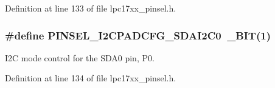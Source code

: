 Definition at line 133 of file lpc17xx\+\_\+pinsel.\+h.

\subsubsection[{\texorpdfstring{P\+I\+N\+S\+E\+L\+\_\+\+I2\+C\+P\+A\+D\+C\+F\+G\+\_\+\+S\+D\+A\+I2\+C0}{PINSEL_I2CPADCFG_SDAI2C0}}]{\setlength{\rightskip}{0pt plus 5cm}\#define P\+I\+N\+S\+E\+L\+\_\+\+I2\+C\+P\+A\+D\+C\+F\+G\+\_\+\+S\+D\+A\+I2\+C0~{\bf \+\_\+\+B\+IT}(1)}\hypertarget{group___p_i_n_s_e_l___private___macros_gacf54f139b5d19b1e076d275670b8bfde}{}\label{group___p_i_n_s_e_l___private___macros_gacf54f139b5d19b1e076d275670b8bfde}
I2C mode control for the S\+D\+A0 pin, P0. 

Definition at line 134 of file lpc17xx\+\_\+pinsel.\+h.

